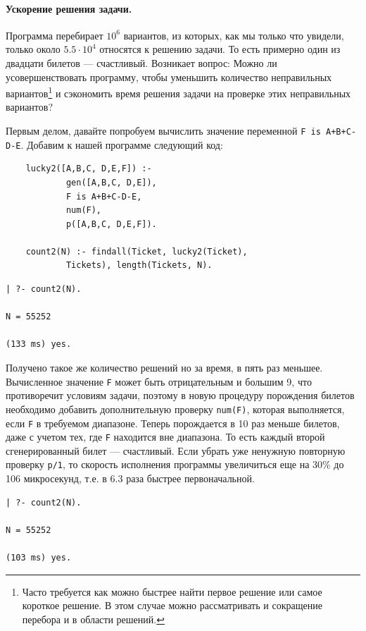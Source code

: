 \documentclass[12pt, openany, twoside]{book} %
\begin{document}
\paragraph{Ускорение решения задачи.} Программа перебирает $10^6$ вариантов, из которых, как мы только что увидели, только около $5.5\cdot 10^4$ относятся к решению задачи. То есть примерно один из двадцати билетов --- счастливый. Возникает вопрос: Можно ли усовершенствовать программу, чтобы уменьшить количество неправильных вариантов\footnote{Часто требуется как можно быстрее найти первое решение или самое короткое решение. В этом случае можно рассматривать и сокращение перебора и в области решений.} и сэкономить время решения задачи на проверке этих неправильных вариантов?

Первым делом, давайте попробуем вычислить значение переменной \texttt{F is A+B+C-D-E}. Добавим к нашей программе следующий код:
{\tt\begin{verbatim}
    lucky2([A,B,C, D,E,F]) :-
            gen([A,B,C, D,E]),
            F is A+B+C-D-E,
            num(F),
            p([A,B,C, D,E,F]).

    count2(N) :- findall(Ticket, lucky2(Ticket),
            Tickets), length(Tickets, N).
\end{verbatim}}
{\tt\begin{verbatim}
| ?- count2(N).

N = 55252

(133 ms) yes.
\end{verbatim}}

\noindent{}Получено такое же количество решений но за время, в пять раз меньшее. Вычисленное значение \texttt{F} может быть отрицательным и большим 9, что противоречит условиям задачи, поэтому в новую процедуру порождения билетов необходимо добавить дополнительную проверку \texttt{num(F)}, которая выполняется, если \texttt{F} в требуемом диапазоне. Теперь порождается в 10 раз меньше билетов, даже с учетом тех, где \texttt{F} находится вне диапазона. То есть каждый второй сгенерированный билет --- счастливый.  Если убрать уже ненужную повторную проверку \texttt{p/1}, то скорость исполнения программы увеличиться еще на 30\% до 106 микросекунд, т.е. в 6.3 раза быстрее первоначальной.
{\tt\begin{verbatim}
| ?- count2(N).

N = 55252

(103 ms) yes.
\end{verbatim}}
\end{document}
